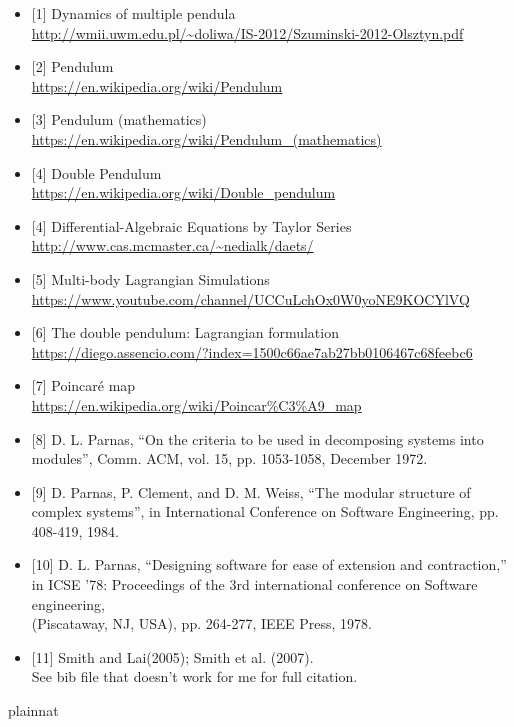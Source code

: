 \documentclass[12pt, titlepage]{article}
\begin{document}
\begin{itemize}
\item{[1]} Dynamics of multiple pendula \\\url{http://wmii.uwm.edu.pl/~doliwa/IS-2012/Szuminski-2012-Olsztyn.pdf}
\item{[2]} Pendulum \\\url{https://en.wikipedia.org/wiki/Pendulum}
\item{[3]} Pendulum (mathematics)
\\\url{https://en.wikipedia.org/wiki/Pendulum_(mathematics)}
\item{[4]} Double Pendulum
\\\url{https://en.wikipedia.org/wiki/Double_pendulum}\item{[4]}
Differential-Algebraic Equations by Taylor Series
\\\url{http://www.cas.mcmaster.ca/~nedialk/daets/}
\item{[5]} Multi-body Lagrangian Simulations
\\\url{https://www.youtube.com/channel/UCCuLchOx0W0yoNE9KOCYlVQ}
\item{[6]} The double pendulum: Lagrangian formulation
\\\url{https://diego.assencio.com/?index=1500c66ae7ab27bb0106467c68feebc6}
\item{[7]} Poincaré map
\\\url{https://en.wikipedia.org/wiki/Poincar%C3%A9_map}
\item{[8]} D. L. Parnas, ``On the criteria to be used in decomposing systems into modules'', Comm.
ACM, vol. 15, pp. 1053-1058, December 1972.
\item{[9]} D. Parnas, P. Clement, and D. M. Weiss, ``The modular structure of complex systems'',
in International Conference on Software Engineering, pp. 408-419, 1984.
\item{[10]} D. L. Parnas, ``Designing software for ease of extension and contraction,'' in ICSE '78:
Proceedings of the 3rd international conference on Software engineering, \\
(Piscataway, NJ, USA), pp. 264-277, IEEE Press, 1978.
\item{[11]} Smith and Lai(2005); Smith et al. (2007). \\
See bib file that doesn't work for me for full citation.
\end{itemize}

 {plainnat}

\end{document}
